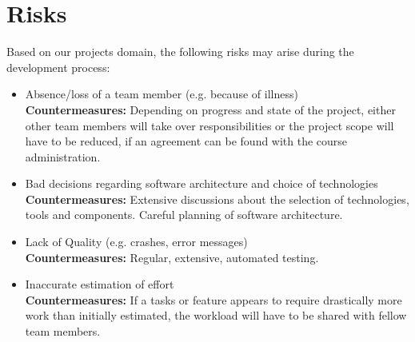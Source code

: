 \section{Risks\label{sec:risks}}
Based on our projects domain, the following risks may arise during the development process:
\begin{itemize}
	\item Absence/loss of a team member (e.g. because of illness)
    \\\textbf{Countermeasures:} Depending on progress and state of the project, either other team members will take over responsibilities or the project scope will have to be reduced, if an agreement can be found with the course administration.

	\item Bad decisions regarding software architecture and choice of technologies
	\\\textbf{Countermeasures:} Extensive discussions about the selection of technologies, tools and components. Careful planning of software architecture.
	
	\item Lack of Quality (e.g. crashes, error messages)
	\\\textbf{Countermeasures:} Regular, extensive, automated testing.
	
	\item Inaccurate estimation of effort
	\\\textbf{Countermeasures:} If a tasks or feature appears to require drastically more work than initially estimated, the workload will have to be shared with fellow team members.
\end{itemize}

\newpage
\listoffigures
\listoftables



